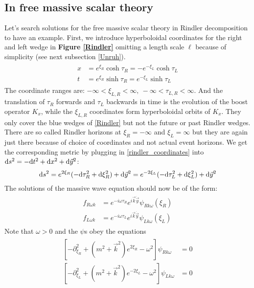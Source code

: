 \subsection{In free massive scalar theory \checkmark}	
	Let's search solutions for the free massive scalar theory in Rindler decomposition to have an example. First, we introduce hyperboloidal coordinates for the right and left wedge in \textbf{Figure \ref{Rindler}} omitting a length scale $\ell$ because of simplicity (see next subsection \ref{Unruh}).
	\begin{align} \label{rindler_coordinates}
		\begin{split}
		x &= e^{\xi_R} \cosh \tau_R = -e^{-\xi_L} \cosh \tau_L \\
		t &= e^{\xi_R} \sinh \tau_R = e^{-\xi_L} \sinh \tau_L
		\end{split}
	\end{align}
	The coordinate ranges are: $-\infty < \xi_{L,R} < \infty,~ -\infty < \tau_{L,R} < \infty$.
	And the translation of $\tau_R$ forwards and $\tau_L$ backwards in time is the evolution of the boost operator $K_x$, while the $\xi_{L,R}$ coordinates form hyperboloidal orbits of $K_x$. They only cover the blue wedges of \ref{Rindler} but not the future or past Rindler wedges. There are so called Rindler horizons at $\xi_R=-\infty$ and $\xi_L=\infty$ but they are again just there because of choice of coordinates and not actual event horizons. 
	We get the corresponding metric by plugging in \eqref{rindler_coordinates} into $\mathrm{d} s^2 = -\mathrm{d} t^2 + \mathrm{d} x^2 + \mathrm{d} \vec{y}^2$:
	\begin{align} \label{Rindler_metric}
		\mathrm{d} s^2 = e^{2\xi_R} (-\mathrm{d} \tau_R^2 + \mathrm{d} \xi_R^2) + \mathrm{d} \vec{y}^2 
		= e^{-2\xi_L} (-\mathrm{d} \tau_L^2 + \mathrm{d} \xi_L^2) + \mathrm{d} \vec{y}^2
 	\end{align}
 	The solutions of the massive wave equation should now be of the form:
	\begin{align} \label{modes}
		\begin{split}
		f_{R\omega k} &= e^{-i\omega \tau_R} e^{i\vec{k}\dot \vec{y}} \psi_{Rk\omega}(\xi_R) \\
		f_{L\omega k} &= e^{-i\omega \tau_L} e^{i\vec{k}\dot \vec{y}} \psi_{Lk\omega}(\xi_L)
		\end{split}
	\end{align}
	Note that $\omega > 0$ and the $\psi$s obey the equations
	\begin{align}
	\begin{split}
		\left[
			-\partial^2_{\xi_R} + (m^2 + \vec{k}^2) e^{2\xi_R} - \omega^2
		\right] \psi_{Rk\omega} &= 0 \\
		\left[
			-\partial^2_{\xi_L} + (m^2 + \vec{k}^2) e^{-2\xi_L} - \omega^2
		\right] \psi_{Lk\omega} &= 0
	\end{split}
	\end{align} 
